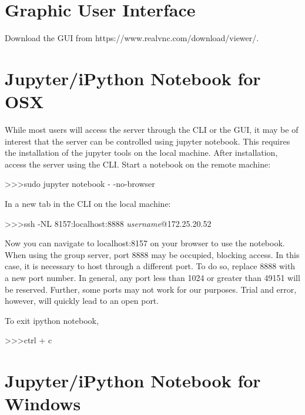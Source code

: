 \section{Graphic User Interface}

Download the GUI from https://www.realvnc.com/download/viewer/.\\

\section{Jupyter/iPython Notebook for OSX}

While most users will access the server through the CLI or the GUI, it may be of interest that the server can be controlled using jupyter notebook. This requires the installation of the jupyter tools on the local machine. After installation, access the server using the CLI. Start a notebook on the remote machine:\\

\begin{mdframed}
\textgreater\textgreater\textgreater \quad sudo jupyter notebook - -no-browser
\end{mdframed}

In a new tab in the CLI on the local machine:\\

\begin{mdframed}
\textgreater\textgreater\textgreater \quad ssh -NL 8157:localhost:8888 \textit{username}@172.25.20.52
\end{mdframed}

Now you can navigate to localhost:8157 on your browser to use the notebook.\\

When using the group server, port 8888 may be occupied, blocking access. In this case, it is necessary to host through a different port. To do so, replace 8888 with a new port number. In general, any port less than 1024 or greater than 49151 will be reserved. Further, some ports may not work for our purposes. Trial and error, however, will quickly lead to an open port.

To exit ipython notebook,

\begin{mdframed}
\textgreater\textgreater\textgreater \quad ctrl + c
\end{mdframed}

\section{Jupyter/iPython Notebook for Windows}


